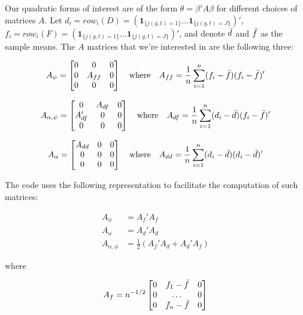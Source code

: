 \documentclass[12pt]{article}
\begin{document}
Our quadratic forms of interest are of the form $\theta = \beta' A \beta$ for different choices of matrices $A$. Let $d_i = row_i(D) = (\boldsymbol{1}_{\{j(g,t)=1\}}  \dots \boldsymbol{1}_{\{j(g,t)=J\}})'$,  $f_i = row_i(F) = (\boldsymbol{1}_{\{j(g,t)=1\}} \dots \boldsymbol{1}_{\{j(g,t)=J\}} )'$, and denote $\Bar{d}$ and $\Bar{f}$ as the sample means. The $A$ matrices that we're interested in are the following three:

\begin{align*}
A_{\psi} = \begin{bmatrix}
0 & 0 & 0\\
0 & A_{ff} & 0\\
0 & 0 & 0
\end{bmatrix} \quad \text{where} \quad A_{ff} = \frac{1}{n} \sum_{i=1}^n (f_i - \Bar{f})(f_i - \Bar{f})'
\end{align*}

\begin{align*}
A_{\alpha,\psi} = \begin{bmatrix}
0 & A_{df} & 0\\
A_{df}' & 0 & 0\\
0 & 0 & 0
\end{bmatrix} \quad \text{where} \quad A_{df} = \frac{1}{n} \sum_{i=1}^n (d_i - \Bar{d})(f_i - \Bar{f})'
\end{align*}

\begin{align*}
A_{\alpha} = \begin{bmatrix}
A_{dd} & 0 & 0\\
0 & 0 & 0\\
0 & 0 & 0
\end{bmatrix} \quad \text{where} \quad A_{dd} = \frac{1}{n} \sum_{i=1}^n (d_i - \Bar{d})(d_i - \Bar{d})'
\end{align*}

The code uses the following representation to facilitate the computation of such matrices: 

\begin{align*}
    A_\phi &= A_f'A_f\\
    A_\alpha &= A_d'A_d\\
    A_{\alpha,\phi} &= \frac{1}{2} (A_f'A_d + A_d'A_f)
\end{align*}

where

\begin{equation}
    A_f = n^{-1/2} \begin{bmatrix}
0 & f_1 - \Bar{f} & 0\\
0 & \dots & 0\\
0 & f_n - \Bar{f} & 0 
\end{bmatrix}
\end{equation}
\end{document}

